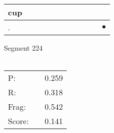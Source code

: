 \documentclass[landscape]{article}
\newcommand{\ssp}{\hspace{2pt}}
\newcommand{\mex}{\cellcolor{g}$\bullet$}
\begin{document}
\begin{tabular}{|l|p{10pt}|p{10pt}|p{10pt}|p{10pt}|p{10pt}|p{10pt}|p{10pt}|p{10pt}|p{10pt}|p{10pt}|}
\hline
\ssp cup \ssp&\hspace{2pt}&\hspace{2pt}&\hspace{2pt}&\hspace{2pt}&\hspace{2pt}&\hspace{2pt}&\hspace{2pt}&\hspace{2pt}&\hspace{2pt}&\hspace{2pt}\\
\hline
\ssp \cellcolor{ref9}. \ssp&\hspace{2pt}&\hspace{2pt}&\hspace{2pt}&\hspace{2pt}&\hspace{2pt}&\hspace{2pt}&\hspace{2pt}&\hspace{2pt}&\hspace{2pt}&\hspace{2pt}\mex\\
\hline
\end{tabular}

\vspace{6pt}
\noindent Segment 224\\\\
\noindent\begin{tabular}{lm{12pt}r}
\hline
P:&&0.259\\
R:&&0.318\\
Frag:&&0.542\\
Score:&&0.141\\
\end{tabular}

\newpage
\end{document}
